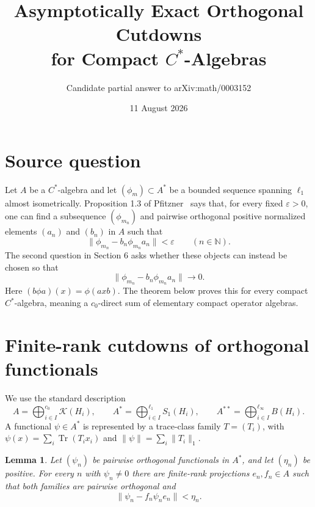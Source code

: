 \documentclass[11pt]{article}
\title{Asymptotically Exact Orthogonal Cutdowns\\
for Compact $C^*$-Algebras}
\author{Candidate partial answer to arXiv:math/0003152}
\date{11 August 2026}
\newtheorem{lemma}[theorem]{Lemma}
\newcommand{\K}{\mathcal K}
\newcommand{\Sone}{S_1}
\begin{document}
\maketitle

\begin{center}
\end{center}

\section{Source question}

Let $A$ be a $C^*$-algebra and let $(\phi_m)\subset A^*$ be a bounded
sequence spanning $\ell_1$ almost isometrically.  Proposition 1.3 of
Pfitzner~\cite{Pfi02} says that, for every fixed $\varepsilon>0$, one can
find a subsequence $(\phi_{m_n})$ and pairwise orthogonal positive normalized
elements $(a_n)$ and $(b_n)$ in $A$ such that
\[
 \|\phi_{m_n}-b_n\phi_{m_n}a_n\|<\varepsilon
 \qquad(n\in\mathbb N).
\]
The second question in Section 6 asks whether these objects can instead be
chosen so that
\begin{equation}\label{eq:question}
 \|\phi_{m_n}-b_n\phi_{m_n}a_n\|\longrightarrow0.
\end{equation}
Here $(b\phi a)(x)=\phi(axb)$.  The theorem below proves this for every
compact $C^*$-algebra, meaning a $c_0$-direct sum of elementary compact
operator algebras.

\section{Finite-rank cutdowns of orthogonal functionals}

We use the standard description
\[
 A=\bigoplus_{i\in I}^{c_0}\K(H_i),\qquad
 A^*=\bigoplus_{i\in I}^{\ell_1}\Sone(H_i),\qquad
 A^{**}=\bigoplus_{i\in I}^{\ell_\infty}B(H_i).
\]
A functional $\psi\in A^*$ is represented by a trace-class family
$T=(T_i)$, with $\psi(x)=\sum_i\operatorname{Tr}(T_i x_i)$ and
$\|\psi\|=\sum_i\|T_i\|_1$.

\begin{lemma}\label{lem:cut}
Let $(\psi_n)$ be pairwise orthogonal functionals in $A^*$, and let
$(\eta_n)$ be positive.  For every $n$ with $\psi_n\ne0$ there are
finite-rank projections $e_n,f_n\in A$ such that both families are pairwise
orthogonal and
\[
 \|\psi_n-f_n\psi_ne_n\|<\eta_n.
\]
\end{lemma}
\end{document}
